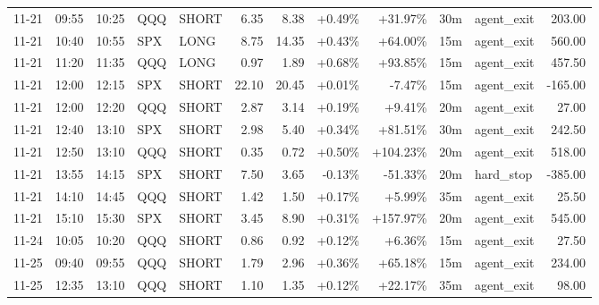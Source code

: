 \documentclass[11pt,a4paper]{article}
\begin{document}
\begin{center}
\begin{longtable}{>{\color{txtmain}}l l l l l r r r r r >{\color{txtmain}}l r}
11-21 & 09:55 & 10:25 & QQQ & SHORT & 6.35 & 8.38 & \textcolor{wingreen}{+0.49\%} & \textcolor{wingreen}{+31.97\%} & 30m & agent\_exit & \textcolor{wingreen}{203.00} \\
11-21 & 10:40 & 10:55 & SPX & LONG & 8.75 & 14.35 & \textcolor{wingreen}{+0.43\%} & \textcolor{wingreen}{+64.00\%} & 15m & agent\_exit & \textcolor{wingreen}{560.00} \\
11-21 & 11:20 & 11:35 & QQQ & LONG & 0.97 & 1.89 & \textcolor{wingreen}{+0.68\%} & \textcolor{wingreen}{+93.85\%} & 15m & agent\_exit & \textcolor{wingreen}{457.50} \\
11-21 & 12:00 & 12:15 & SPX & SHORT & 22.10 & 20.45 & \textcolor{wingreen}{+0.01\%} & \textcolor{lossred}{-7.47\%} & 15m & agent\_exit & \textcolor{lossred}{-165.00} \\
11-21 & 12:00 & 12:20 & QQQ & SHORT & 2.87 & 3.14 & \textcolor{wingreen}{+0.19\%} & \textcolor{wingreen}{+9.41\%} & 20m & agent\_exit & \textcolor{wingreen}{27.00} \\
11-21 & 12:40 & 13:10 & SPX & SHORT & 2.98 & 5.40 & \textcolor{wingreen}{+0.34\%} & \textcolor{wingreen}{+81.51\%} & 30m & agent\_exit & \textcolor{wingreen}{242.50} \\
11-21 & 12:50 & 13:10 & QQQ & SHORT & 0.35 & 0.72 & \textcolor{wingreen}{+0.50\%} & \textcolor{wingreen}{+104.23\%} & 20m & agent\_exit & \textcolor{wingreen}{518.00} \\
11-21 & 13:55 & 14:15 & SPX & SHORT & 7.50 & 3.65 & \textcolor{lossred}{-0.13\%} & \textcolor{lossred}{-51.33\%} & 20m & hard\_stop & \textcolor{lossred}{-385.00} \\
11-21 & 14:10 & 14:45 & QQQ & SHORT & 1.42 & 1.50 & \textcolor{wingreen}{+0.17\%} & \textcolor{wingreen}{+5.99\%} & 35m & agent\_exit & \textcolor{wingreen}{25.50} \\
11-21 & 15:10 & 15:30 & SPX & SHORT & 3.45 & 8.90 & \textcolor{wingreen}{+0.31\%} & \textcolor{wingreen}{+157.97\%} & 20m & agent\_exit & \textcolor{wingreen}{545.00} \\
11-24 & 10:05 & 10:20 & QQQ & SHORT & 0.86 & 0.92 & \textcolor{wingreen}{+0.12\%} & \textcolor{wingreen}{+6.36\%} & 15m & agent\_exit & \textcolor{wingreen}{27.50} \\
11-25 & 09:40 & 09:55 & QQQ & SHORT & 1.79 & 2.96 & \textcolor{wingreen}{+0.36\%} & \textcolor{wingreen}{+65.18\%} & 15m & agent\_exit & \textcolor{wingreen}{234.00} \\
11-25 & 12:35 & 13:10 & QQQ & SHORT & 1.10 & 1.35 & \textcolor{wingreen}{+0.12\%} & \textcolor{wingreen}{+22.17\%} & 35m & agent\_exit & \textcolor{wingreen}{98.00} \\

\end{longtable}
\end{center}
\end{document}
